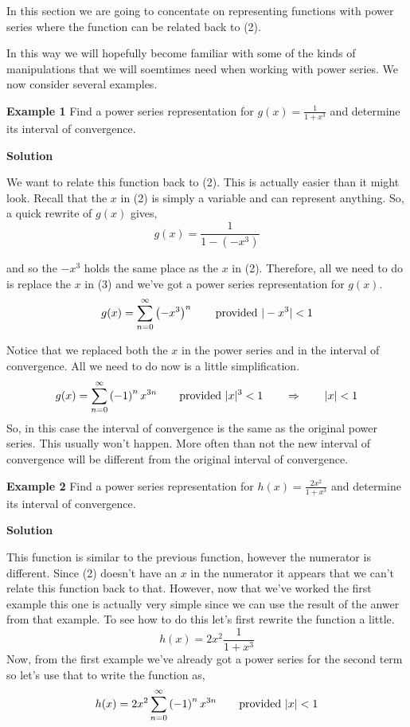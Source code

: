 \documentclass[10pt]{article}
\newcommand{\ds}{\displaystyle}
\begin{document}
In this section we are going to concentate on representing functions with power series where the function can be related back to (2).  


In this way we will hopefully become familiar with some of the kinds of manipulations that we will soemtimes need when working with power series. We now consider several examples.

{\bf Example 1}  Find a power series representation for $\ds g(x) = \frac{1}{1+x^3}$ and determine its interval of convergence.  

{\bf Solution} 

We want to relate this function back to (2).  This is actually easier than it might look.  Recall that the $x$ in (2) is simply a variable and can represent anything.  So, a quick rewrite of $g(x)$ gives,
$$g(x) = \frac{1}{1-(-x^3)}$$

and so the $-x^3$ holds the same place as the $x$ in (2).  Therefore, all we need to do is replace the $x$ in (3) and we've got a power series representation for $g(x)$.  
$$g(x) = \sum\limits_{n=0}^{\infty}\left( -x^3 \right)^n \qquad {\rm provided} \ |-x^3|<1$$

Notice that we replaced both the $x$ in the power series and in the interval of convergence. All we need to do now is a little simplification.
$$g(x) = \sum\limits_{n=0}^{\infty}\left( -1 \right)^n x^{3n} \qquad {\rm provided} \ |x|^3<1 \qquad \Rightarrow \qquad |x|<1$$
So, in this case the interval of convergence is the same as the original power series.  This usually won't happen.  More often than not the new interval of convergence will be different from the original interval of convergence.  


{\bf Example 2}  Find a power series representation for $\ds h(x) = \frac{2x^2}{1+x^3}$ and determine its interval of convergence.  

{\bf Solution}

This function is similar to the previous function, however the numerator is different.  Since (2) doesn't have an $x$ in the numerator it appears that we can't relate this function back to that.  However, now that we've worked the first example this one is actually very simple since we can use the result of the anwer from that example.  To see how to do this let's first rewrite the function a little. 
$$ h(x) = 2x^2 \frac{1}{1+x^3}$$ Now, from the first example we've already got a power series for the second term so let's use that to write the function as, 
$$ h(x) = 2x^2 \sum\limits_{n=0}^{\infty}\left( -1 \right)^n x^{3n} \qquad {\rm provided} \ |x|<1$$
\end{document}
